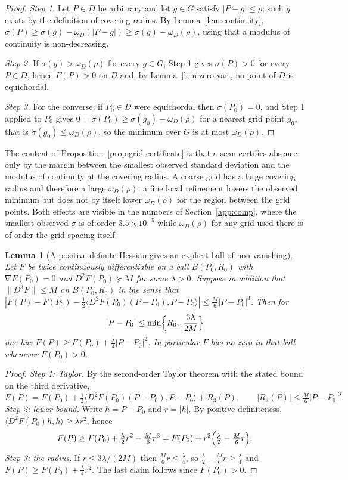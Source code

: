 \documentclass[11pt]{article}
\newtheorem{lemma}[theorem]{Lemma}
\theoremstyle{definition}
\theoremstyle{remark}
\begin{document}
\begin{proof}
\emph{Step 1.} Let $P\in D$ be arbitrary and let $g\in G$ satisfy $|P-g|\le\rho$; such $g$ exists by the definition
of covering radius. By Lemma~\ref{lem:continuity}, $\sigma(P)\ge\sigma(g)-\omega_D(|P-g|)\ge\sigma(g)-\omega_D(\rho)$,
using that a modulus of continuity is non-decreasing.

\emph{Step 2.} If $\sigma(g)>\omega_D(\rho)$ for every $g\in G$, Step 1 gives $\sigma(P)>0$ for every $P\in D$, hence
$F(P)>0$ on $D$ and, by Lemma~\ref{lem:zero-var}, no point of $D$ is equichordal.

\emph{Step 3.} For the converse, if $P_0\in D$ were equichordal then $\sigma(P_0)=0$, and Step 1 applied to
$P_0$ gives $0=\sigma(P_0)\ge\sigma(g_0)-\omega_D(\rho)$ for a nearest grid point $g_0$, that is
$\sigma(g_0)\le\omega_D(\rho)$, so the minimum over $G$ is at most $\omega_D(\rho)$.
\end{proof}

The content of Proposition~\ref{prop:grid-certificate} is that a scan certifies absence only by the margin between
the smallest observed standard deviation and the modulus of continuity at the covering radius. A coarse grid has
a large covering radius and therefore a large $\omega_D(\rho)$; a fine local refinement lowers the observed
minimum but does not by itself lower $\omega_D(\rho)$ for the region between the grid points. Both effects are
visible in the numbers of Section~\ref{app:comp}, where the smallest observed $\sigma$ is of order $3.5\times10^{-5}$
while $\omega_D(\rho)$ for any grid used there is of order the grid spacing itself.

\begin{lemma}[A positive-definite Hessian gives an explicit ball of non-vanishing]\label{lem:hessian}
Let $F$ be twice continuously differentiable on a ball $B(P_0,R_0)$ with $\nabla F(P_0)=0$ and
$D^2F(P_0)\succeq \lambda I$ for some $\lambda>0$. Suppose in addition that $\|D^3F\|\le M$ on $B(P_0,R_0)$ in the
sense that $|F(P)-F(P_0)-\tfrac12\langle D^2F(P_0)(P-P_0),P-P_0\rangle|\le \tfrac{M}{6}|P-P_0|^3$. Then for
\[
|P-P_0|\le \min\Bigl\{R_0,\ \frac{3\lambda}{2M}\Bigr\}
\]
one has $F(P)\ge F(P_0)+\tfrac{\lambda}{4}|P-P_0|^2$. In particular $F$ has no zero in that ball whenever
$F(P_0)>0$.
\end{lemma}

\begin{proof}
\emph{Step 1: Taylor.} By the second-order Taylor theorem with the stated bound on the third derivative,
\[
F(P)=F(P_0)+\tfrac12\langle D^2F(P_0)(P-P_0),P-P_0\rangle+R_3(P),\qquad |R_3(P)|\le\tfrac{M}{6}|P-P_0|^3 .
\]
\emph{Step 2: lower bound.} Write $h=P-P_0$ and $r=|h|$. By positive definiteness,
$\langle D^2F(P_0)h,h\rangle\ge\lambda r^2$, hence
\[
F(P)\ge F(P_0)+\tfrac{\lambda}{2}r^2-\tfrac{M}{6}r^3=F(P_0)+r^2\Bigl(\tfrac{\lambda}{2}-\tfrac{M}{6}r\Bigr).
\]
\emph{Step 3: the radius.} If $r\le 3\lambda/(2M)$ then $\tfrac{M}{6}r\le\tfrac{\lambda}{4}$, so
$\tfrac{\lambda}{2}-\tfrac{M}{6}r\ge\tfrac{\lambda}{4}$ and $F(P)\ge F(P_0)+\tfrac{\lambda}{4}r^2$. The last claim
follows since $F(P_0)>0$.
\end{proof}
\end{document}
